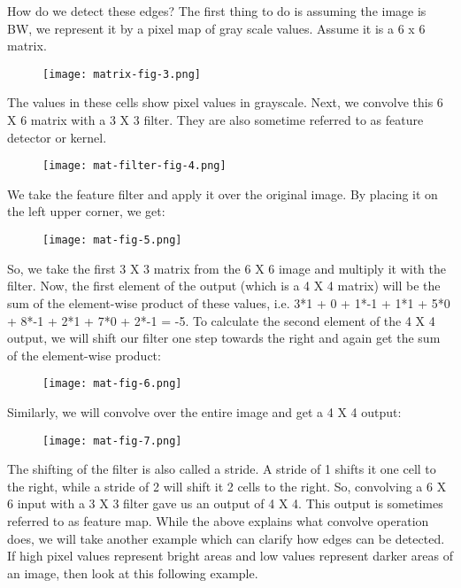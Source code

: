 How do we detect these edges? The first thing to do is assuming the image is BW, we represent it by a pixel map of gray scale values. Assume it is a 6 x 6 matrix.

\begin{figure}
  \texttt{[image: matrix-fig-3.png]}
\end{figure}

The values in these cells show pixel values in grayscale. Next, we convolve this 6 X 6 matrix with a 3 X 3 filter. They are also sometime referred to as feature detector or kernel.

\begin{figure}
  \texttt{[image: mat-filter-fig-4.png]}
\end{figure}

We take the feature filter and apply it over the original image. By placing it on the left upper corner, we get:

\begin{figure}
  \texttt{[image: mat-fig-5.png]}
\end{figure}

So, we take the first 3 X 3 matrix from the 6 X 6 image and multiply it with the filter. Now, the first element of the output (which is a 4 X 4 matrix) will be the sum of the element-wise product of these values, i.e. 3*1 + 0 + 1*-1 + 1*1 + 5*0 + 8*-1 + 2*1 + 7*0 + 2*-1 = -5. To calculate the second element of the 4 X 4 output, we will shift our filter one step towards the right and again get the sum of the element-wise product:

\begin{figure}
  \texttt{[image: mat-fig-6.png]}
\end{figure}

Similarly, we will convolve over the entire image and get a 4 X 4 output:

\begin{figure}
  \texttt{[image: mat-fig-7.png]}
\end{figure}

The shifting of the filter is also called a stride. A stride of 1 shifts it one cell to the right, while a stride of 2 will shift it 2 cells to the right. So, convolving a 6 X 6 input with a 3 X 3 filter gave us an output of 4 X 4. This output is sometimes referred to as feature map. While the above explains what convolve operation does, we will take another example which can clarify how edges can be detected. If high pixel values represent bright areas and low values represent darker areas of an image, then look at this following example.


